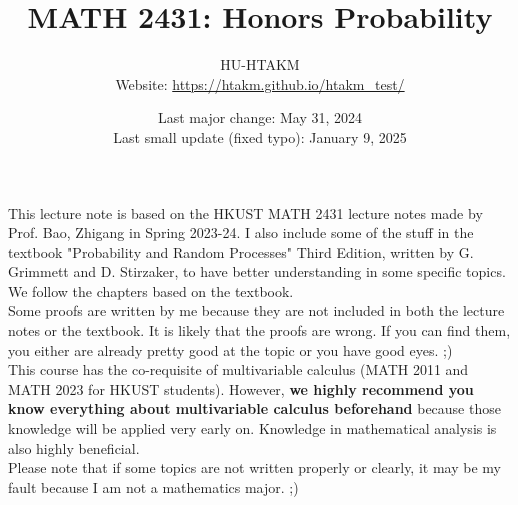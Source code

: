 \documentclass{huhtakm-template-book}
\title{MATH 2431: Honors Probability}
\author{
	HU-HTAKM\\
	Website: \url{https://htakm.github.io/htakm_test/}
}
\date{
	Last major change: May 31, 2024\\
	Last small update (fixed typo): January 9, 2025
}
\begin{document}
\maketitle
This lecture note is based on the HKUST MATH 2431 lecture notes made by Prof. Bao, Zhigang in Spring 2023-24. I also include some of the stuff in the textbook "Probability and Random Processes" Third Edition, written by G. Grimmett and D. Stirzaker, to have better understanding in some specific topics. We follow the chapters based on the textbook.\\
Some proofs are written by me because they are not included in both the lecture notes or the textbook. It is likely that the proofs are wrong. If you can find them, you either are already pretty good at the topic or you have good eyes. ;)\\
This course has the co-requisite of multivariable calculus (MATH 2011 and MATH 2023 for HKUST students). However, \textbf{we highly recommend you know everything about multivariable calculus beforehand} because those knowledge will be applied very early on. Knowledge in mathematical analysis is also highly beneficial.\\
Please note that if some topics are not written properly or clearly, it may be my fault because I am not a mathematics major. ;)
\end{document}
